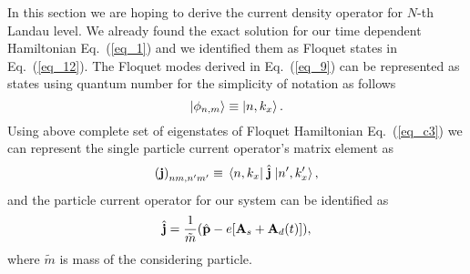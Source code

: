In this section we are hoping to derive the current density operator for $N$-th Landau level. We already found the exact solution for our time dependent Hamiltonian Eq.~(\ref{eq_1}) and we identified them as Floquet states in Eq.~(\ref{eq_12}). The Floquet modes derived in Eq.~(\ref{eq_9}) can be represented as states using quantum number for the simplicity of notation as follows
\begin{equation} \label{eq_d1}
  \ket{\phi_{n,m}} \equiv \ket{n,k_x}.
\end{equation}
Using above complete set of eigenstates of Floquet Hamiltonian Eq.~(\ref{eq_c3}) \cite{wackerl20,holthaus15,grifoni98} we can represent the single particle current operator's matrix element as
\begin{equation} \label{eq_d2}
  \qty(\vb{j})_{nm,n'm'} \equiv \mel{n,k_x}{\;\hat{\vb{j}}\;}{n',k'_x},
\end{equation}
and the particle current operator for our system \cite{mahan00,bruus04} can be identified as
\begin{equation} \label{eq_d3}
  \hat{\vb{j}} = \frac{1}{\tilde{m}} \qty(\hat{\vb{p}} - e\qty[\vb{A}_s + \vb{A}_d(t)]),
\end{equation}
where $\tilde{m}$ is mass of the considering particle.

